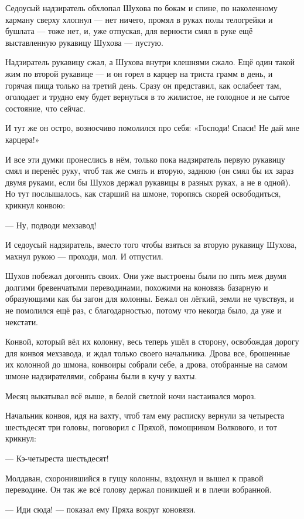 Седоусый надзиратель обхлопал Шухова по бокам и спине, по наколенному карману сверху
хлопнул --- нет ничего, промял в руках полы телогрейки и бушлата --- тоже нет, и, уже отпуская,
для верности смял в руке ещё выставленную рукавицу Шухова --- пустую.

Надзиратель рукавицу сжал, а Шухова внутри клешнями сжало. Ещё один такой жим по второй
рукавице --- и он горел в карцер на триста грамм в день, и горячая пища только на третий день.
Сразу он представил, как ослабеет там, оголодает и трудно ему будет вернуться в то жилистое,
не голодное и не сытое состояние, что сейчас.

И тут же он остро, возносчиво помолился про себя: «Господи! Спаси! Не дай мне карцера!»

И все эти думки пронеслись в нём, только пока надзиратель первую рукавицу смял и перенёс
руку, чтоб так же смять и вторую, заднюю (он смял бы их зараз двумя руками, если бы Шухов
держал рукавицы в разных руках, а не в одной). Но тут послышалось, как старший на шмоне,
торопясь скорей освободиться, крикнул конвою:

--- Ну, подводи мехзавод!

И седоусый надзиратель, вместо того чтобы взяться за вторую рукавицу Шухова, махнул рукою ---
проходи, мол. И отпустил.

Шухов побежал догонять своих. Они уже выстроены были по пять меж двумя долгими бревенчатыми
переводинами, похожими на коновязь базарную и образующими как бы загон для колонны. Бежал он
лёгкий, земли не чувствуя, и не помолился ещё раз, с благодарностью, потому что некогда было,
да уже и некстати.

Конвой, который вёл их колонну, весь теперь ушёл в сторону, освобождая дорогу для конвоя
мехзавода, и ждал только своего начальника. Дрова все, брошенные их колонной до шмона,
конвоиры собрали себе, а дрова, отобранные на самом шмоне надзирателями, собраны были в кучу
у вахты.

Месяц выкатывал всё выше, в белой светлой ночи настаивался мороз.

Начальник конвоя, идя на вахту, чтоб там ему расписку вернули за четыреста шестьдесят три
головы, поговорил с Пряхой, помощником Волкового, и тот крикнул:

--- Кэ-четыреста шестьдесят!

Молдаван, схоронившийся в гущу колонны, вздохнул и вышел к правой переводине. Он так же всё
голову держал поникшей и в плечи вобранной.

--- Иди сюда! --- показал ему Пряха вокруг коновязи.

